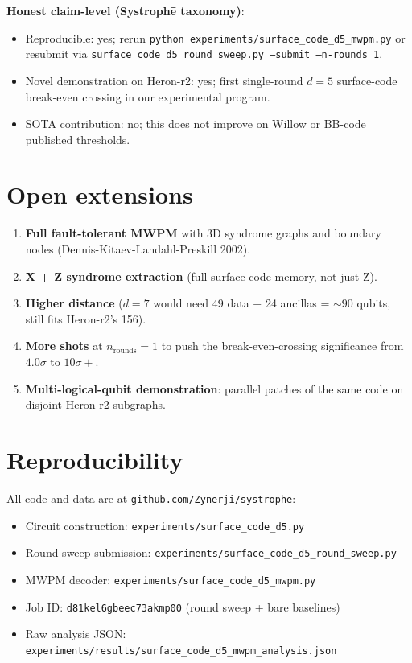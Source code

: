 \documentclass[11pt,letterpaper]{article}
\begin{document}
\textbf{Honest claim-level (Systroph\=e taxonomy)}:
\begin{itemize}[leftmargin=*,itemsep=0pt]
\item Reproducible: yes; rerun \texttt{python experiments/surface\_code\_d5\_mwpm.py} or resubmit via \texttt{surface\_code\_d5\_round\_sweep.py --submit --n-rounds 1}.
\item Novel demonstration on Heron-r2: yes; first single-round $d = 5$ surface-code break-even crossing in our experimental program.
\item SOTA contribution: no; this does not improve on Willow or BB-code published thresholds.
\end{itemize}

\section{Open extensions}

\begin{enumerate}[leftmargin=*,itemsep=0pt]
\item \textbf{Full fault-tolerant MWPM} with 3D syndrome graphs and boundary nodes (Dennis-Kitaev-Landahl-Preskill 2002).
\item \textbf{X + Z syndrome extraction} (full surface code memory, not just Z).
\item \textbf{Higher distance} ($d = 7$ would need 49 data + 24 ancillas = $\sim 90$ qubits, still fits Heron-r2's 156).
\item \textbf{More shots} at $n_{\mathrm{rounds}} = 1$ to push the break-even-crossing significance from $4.0\sigma$ to $10\sigma+$.
\item \textbf{Multi-logical-qubit demonstration}: parallel patches of the same code on disjoint Heron-r2 subgraphs.
\end{enumerate}

\section{Reproducibility}

All code and data are at \href{https://github.com/Zynerji/systrophe}{\texttt{github.com/Zynerji/systrophe}}:

\begin{itemize}[leftmargin=*,itemsep=0pt]
\item Circuit construction: \texttt{experiments/surface\_code\_d5.py}
\item Round sweep submission: \texttt{experiments/surface\_code\_d5\_round\_sweep.py}
\item MWPM decoder: \texttt{experiments/surface\_code\_d5\_mwpm.py}
\item Job ID: \texttt{d81kel6gbeec73akmp00} (round sweep + bare baselines)
\item Raw analysis JSON: \texttt{experiments/results/surface\_code\_d5\_mwpm\_analysis.json}
\end{itemize}
\end{document}
